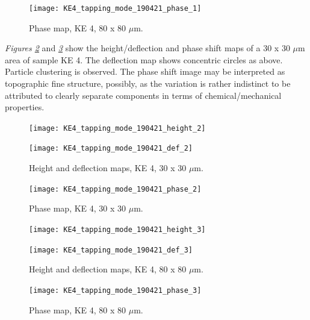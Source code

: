 \begin{figure}[H]
\centering
  \texttt{[image: KE4\_tapping\_mode\_190421\_phase\_1]}
\caption[Phase map, KE 4]{Phase map, KE 4, 80 x 80 $\mu$m.}
\label{fig:afm_ke4_phase_1}
\end{figure}

\textit{Figures \ref{fig:afm_ke4_height_def_2}} and \textit{\ref{fig:afm_ke4_phase_2}} show the height/deflection and phase shift maps of a 30 x 30 $\mu$m area of sample KE 4. The deflection map shows concentric circles as above. Particle clustering is observed. The phase shift image may be interpreted as topographic fine structure, possibly, as the variation is rather indistinct to be attributed to clearly separate components in terms of chemical/mechanical properties.

\begin{figure}[H]
\centering
\begin{minipage}{.45\textwidth}
  \centering
  \texttt{[image: KE4\_tapping\_mode\_190421\_height\_2]}
\end{minipage}
\begin{minipage}{.45\textwidth}
  \centering
  \texttt{[image: KE4\_tapping\_mode\_190421\_def\_2]}
\end{minipage}
\caption[Height and deflection maps, KE 4]{Height and deflection maps, KE 4, 30 x 30 $\mu$m.}
\label{fig:afm_ke4_height_def_2}
\end{figure}

\begin{figure}[H]
\centering
  \texttt{[image: KE4\_tapping\_mode\_190421\_phase\_2]}
\caption[Phase map, KE 4]{Phase map, KE 4, 30 x 30 $\mu$m.}
\label{fig:afm_ke4_phase_2}
\end{figure}


\begin{figure}[H]
\centering
\begin{minipage}{.45\textwidth}
  \centering
  \texttt{[image: KE4\_tapping\_mode\_190421\_height\_3]}
\end{minipage}
\begin{minipage}{.45\textwidth}
  \centering
  \texttt{[image: KE4\_tapping\_mode\_190421\_def\_3]}
\end{minipage}
\caption[Height and deflection maps, KE 4]{Height and deflection maps, KE 4, 80 x 80 $\mu$m.}
\label{fig:afm_ke4_height_def_3}
\end{figure}

\begin{figure}[H]
\centering
  \texttt{[image: KE4\_tapping\_mode\_190421\_phase\_3]}
\caption[Phase map, KE 4]{Phase map, KE 4, 80 x 80 $\mu$m.}
\label{fig:afm_ke4_phase_3}
\end{figure}

